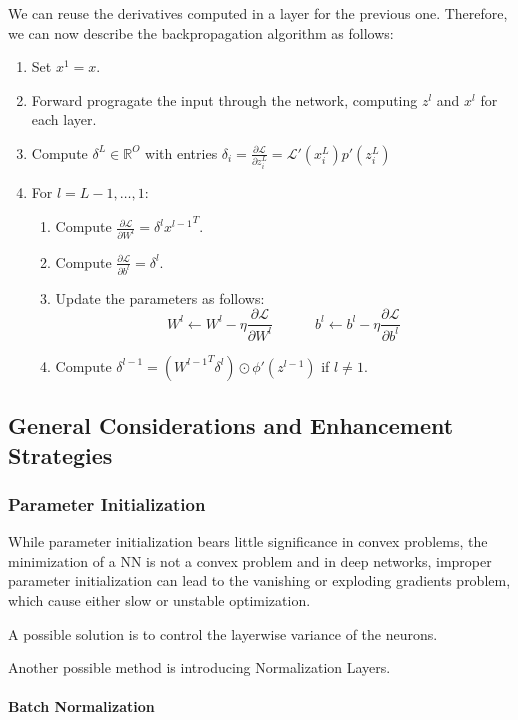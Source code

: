 \documentclass{article}
\newcommand{\R}{\mathbb{R}}
\newcommand{\loss}{\mathcal{L}}
\begin{document}
We can reuse the derivatives computed in a layer for the previous one.
Therefore, we can now describe the backpropagation algorithm as follows:
\begin{enumerate}
    \item Set $x^1 = x$.
    \item Forward progragate the input through the network, computing $z^l$ and $x^l$ for each layer.
    \item Compute $\delta^L \in \R^O$ with entries $\delta_i = \frac{\partial \loss}{\partial z^L_i} = \loss'(x^L_i) p'(z^L_i)$
    \item For $l = L-1, \dots, 1$:
    \begin{enumerate}
	\item Compute $\frac{\partial \loss}{\partial W^l} = \delta^l {x^{l-1}}^T$.
	\item Compute $\frac{\partial \loss}{\partial b^l} = \delta^l$.
	\item Update the parameters as follows:
	$$
	W^l \leftarrow W^l - \eta \frac{\partial \loss}{\partial W^l} \quad \quad \quad
	b^l \leftarrow b^l - \eta \frac{\partial \loss}{\partial b^l}
	$$
    \item Compute $\delta^{l-1} = \left( {W^{l-1}}^T \delta^l \right) \odot \phi'(z^{l-1})$ if $l \neq 1$.
    \end{enumerate}
\end{enumerate}

\subsection{General Considerations and Enhancement Strategies}

\subsubsection{Parameter Initialization}

While parameter initialization bears little significance in convex problems, the minimization of a NN is not a convex problem and in deep networks, improper parameter initialization can lead to the vanishing or exploding gradients problem, which cause either slow or unstable optimization.

A possible solution is to control the layerwise variance of the neurons.

Another possible method is introducing Normalization Layers.

\paragraph{Batch Normalization}
\end{document}

